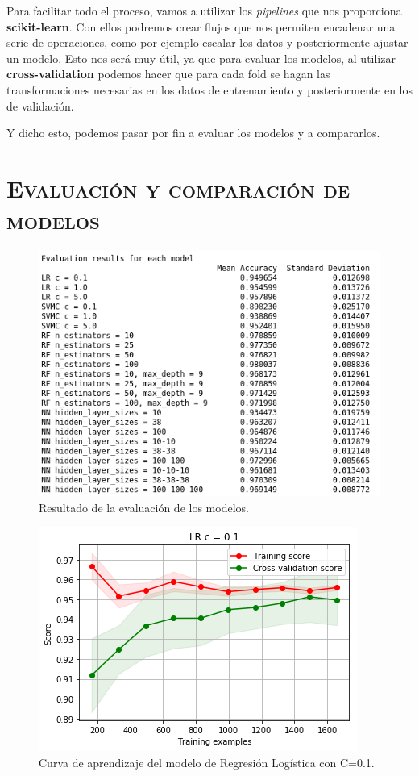 \documentclass[11pt,a4paper]{article}
\begin{document}
Para facilitar todo el proceso, vamos a utilizar los \textit{pipelines} \cite{bib:pipeline} que nos proporciona \textbf{scikit-learn}. Con ellos
podremos crear flujos que nos permiten encadenar una serie de operaciones, como por ejemplo escalar los datos y posteriormente ajustar un modelo.
Esto nos será muy útil, ya que para evaluar los modelos, al utilizar \textbf{cross-validation} podemos hacer que para cada fold se hagan las
transformaciones necesarias en los datos de entrenamiento y posteriormente en los de validación.

Y dicho esto, podemos pasar por fin a evaluar los modelos y a compararlos.

\section{\textsc{Evaluación y comparación de modelos}}

\begin{figure}[H]
    \centering
    \includegraphics[scale=0.6]{img/eval-results.png}
    \caption{Resultado de la evaluación de los modelos.}
    \label{fig:eval-results}
\end{figure}

\begin{figure}[H]
    \centering
    \includegraphics[scale=0.7]{img/lc-lr-c-01.png}
    \caption{Curva de aprendizaje del modelo de Regresión Logística con C=0.1.}
    \label{fig:lc-lr-c-01}
\end{figure}
\end{document}

